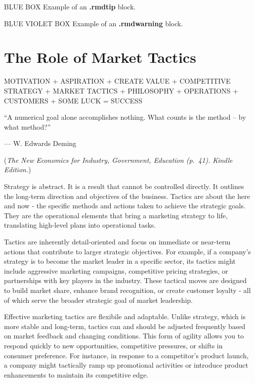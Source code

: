 \documentclass[
]{book}
\begin{document}
BLUE BOX Example of an \textbf{.rmdtip} block.

BLUE VIOLET BOX Example of an \textbf{.rmdwarning} block.

\hypertarget{the-role-of-market-tactics}{%
\chapter{The Role of Market Tactics}\label{the-role-of-market-tactics}}

{MOTIVATION}
{+}
{ASPIRATION}
{+}
{CREATE VALUE}
{+}
{COMPETITIVE STRATEGY }
{+}
{MARKET TACTICS}
{+}
{PHILOSOPHY}
{+}
{OPERATIONS}
{+}
{CUSTOMERS}
{+}
{SOME LUCK}
{=}
{SUCCESS}

``A numerical goal alone accomplishes nothing. What counts is the method -- by what method?''

--- W. Edwards Deming

(\emph{The New Economics for Industry, Government, Education (p.~41). Kindle Edition.})

Strategy is abstract. It is a result that cannot be controlled directly. It outlines the long-term direction and objectives of the business. Tactics are about the here and now - the specific methods and actions taken to achieve the strategic goals. They are the operational elements that bring a marketing strategy to life, translating high-level plans into operational tasks.

Tactics are inherently detail-oriented and focus on immediate or near-term actions that contribute to larger strategic objectives. For example, if a company's strategy is to become the market leader in a specific sector, its tactics might include aggressive marketing campaigns, competitive pricing strategies, or partnerships with key players in the industry. These tactical moves are designed to build market share, enhance brand recognition, or create customer loyalty - all of which serve the broader strategic goal of market leadership.

Effective marketing tactics are flexibile and adaptable. Unlike strategy, which is more stable and long-term, tactics can and should be adjusted frequently based on market feedback and changing conditions. This form of agility allows you to respond quickly to new opportunities, competitive pressures, or shifts in consumer preference. For instance, in response to a competitor's product launch, a company might tactically ramp up promotional activities or introduce product enhancements to maintain its competitive edge.
\end{document}
